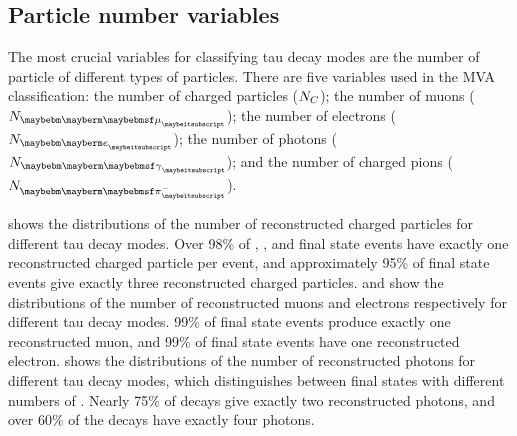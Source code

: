 \subsection{Particle number variables}

The most crucial variables for classifying tau decay modes  are the number of particle of different types of particles. There are five variables used in the MVA classification: the number of charged particles (${N}_{C}$); the number of muons (${N}_{\Pmu}$); the number of electrons (${N}_{\Pe}$); the number of photons (${N}_{\Pgg}$); and the number of charged pions (${N}_{\Pgpm}$).



 shows the distributions of the number of reconstructed charged particles for different tau decay modes. Over 98\% of  \tauToElectron, \tauToMuon, and \tauToPion final state events have exactly one reconstructed charged particle  per event, and approximately 95\% of \decayAiPionShort final state events give exactly three reconstructed charged particles.  and   show the distributions of the number of reconstructed muons and electrons respectively for different tau decay modes. 99\% of \tauToMuon final state events produce exactly one reconstructed muon, and 99\% of \tauToElectron final state events have one reconstructed electron.  shows the distributions of the number of reconstructed photons  for different tau decay modes, which distinguishes between final states with different numbers of \Ppizero.  Nearly 75\% of  \decayRhoShort  decays give exactly two reconstructed photons, and over 60\% of the \decayAiPhotonShort decays have exactly four photons.




